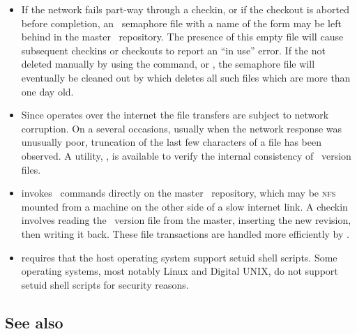 \begin{itemize}
\item
   If the network fails part-way through a checkin, or if the checkout is
   aborted before completion, an \rcs\ semaphore file with a name of the form
   \file{,*,} may be left behind in the master \rcs\ repository.  The presence
   of this empty file will cause subsequent checkins or checkouts to report an
   ``in use'' error.  If the not deleted manually by using the 
   command, or , the semaphore file will eventually be cleaned out
   by  which deletes all such files which are more
   than one day old.

\item
   Since  operates over the internet the file transfers are subject to
   network corruption.  On a several occasions, usually when the network
   response was unusually poor, truncation of the last few characters of a
   file has been observed.  A utility, , is available
   to verify the internal consistency of \rcs\ version files.

\item
    invokes \rcs\ commands directly on the master \rcs\ repository,
   which may be \textsc{nfs} mounted from a machine on the other side of a
   slow internet link.  A checkin involves reading the \rcs\ version file from
   the master, inserting the new revision, then writing it back.  These file
   transactions are handled more efficiently by .

\item
    requires that the host operating system support setuid shell
   scripts.  Some operating systems, most notably Linux and Digital
   UNIX, do not support setuid shell scripts for security reasons.
\end{itemize}

\subsection*{See also}

